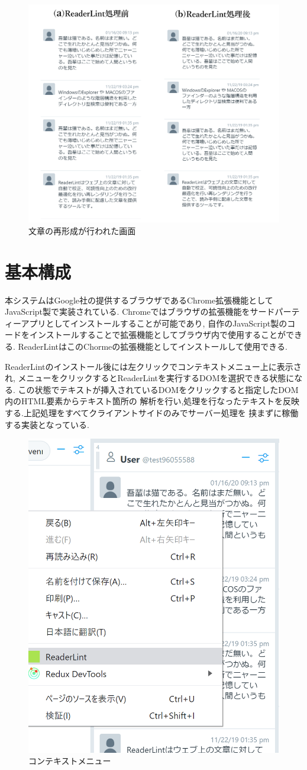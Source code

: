 \begin{figure}[H]
    \centering
    \label{fig:image11}
    \includegraphics[width=0.7\columnwidth]{image/03/img2.png}
    \caption[文章の再形成が行われた画面]{文章の再形成が行われた画面\footnotemark[0]}
\end{figure}


\section{基本構成}

本システムはGoogle社の提供するブラウザであるChrome拡張機能としてJavaScript製で実装されている.
Chromeではブラウザの拡張機能をサードパーティーアプリとしてインストールすることが可能であり,
自作のJavaScript製のコードをインストールすることで拡張機能としてブラウザ内で使用することができる.
ReaderLintはこのChormeの拡張機能としてインストールして使用できる.

ReaderLintのインストール後には左クリックでコンテキストメニュー上に表示され,
メニューをクリックするとReaderLintを実行するDOMを選択できる状態になる.
この状態でテキストが挿入されているDOMをクリックすると指定したDOM内のHTML要素からテキスト箇所の
解析を行い,処理を行なったテキストを反映する.上記処理をすべてクライアントサイドのみでサーバー処理を
挟まずに稼働する実装となっている.

\begin{figure}[H]
    \centering
    \label{fig:image9}
    \includegraphics[width=0.4\columnwidth]{image/03/img0.png}
    \caption[コンテキストメニュー]{コンテキストメニュー}
\end{figure}

